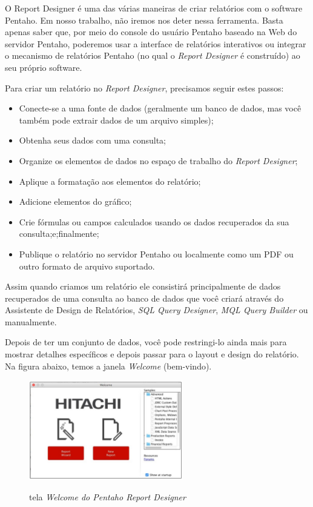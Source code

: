 O Report Designer \'{e} uma das v\'{a}rias maneiras de criar relat\'orios com o software Pentaho. Em nosso trabalho, n\~{a}o iremos nos deter nessa ferramenta. Basta apenas saber que, por meio do console do usu\'{a}rio Pentaho baseado na Web do servidor Pentaho, poderemos usar a interface de relat\'orios interativos ou integrar o mecanismo de relat\'orios Pentaho (no qual o \textit{Report Designer} \'{e} constru\'{i}do) ao seu pr\'oprio software.

Para criar um relat\'orio no \textit{Report Designer}, precisamos seguir estes passos:

\begin{itemize}
    \item Conecte-se a uma fonte de dados (geralmente um banco de dados, mas você tamb\'{e}m pode extrair dados de um arquivo simples);
    \item Obtenha seus dados com uma consulta;
    \item Organize os elementos de dados no espa\c{c}o de trabalho do \textit{Report Designer};
    \item Aplique a formata\c{c}\~{a}o aos elementos do relat\'orio;
    \item Adicione elementos do gr\'{a}fico;
    \item Crie f\'ormulas ou campos calculados usando os dados recuperados da sua consulta;e;finalmente;
    \item Publique o relat\'orio no servidor Pentaho ou localmente como um PDF ou outro formato de arquivo suportado. 
\end{itemize}

Assim quando criamos um relat\'orio ele consistir\'{a} principalmente de dados recuperados de uma consulta ao banco de dados que você criar\'{a} atrav\'{e}s do Assistente de Design de Relat\'orios, \textit{SQL Query Designer}, \textit{MQL Query Builder} ou manualmente. 

Depois de ter um conjunto de dados, você pode restringi-lo ainda mais para mostrar detalhes espec\'{i}ficos e depois passar para o layout e design do relat\'orio. Na figura abaixo, temos a janela \textit{Welcome} (bem-vindo).

\begin{figure}[H]
	\vspace*{0,2cm}
    \centering
    \caption{tela \textit{Welcome do Pentaho Report Designer}}
    \includegraphics[width=0.6\textwidth]{./04-figuras/figura-welcome-prd}
    \label{fig:ilustfigwelcomeprd}
\end{figure}
\vspace*{-0,9cm}
{\raggedright {}} \\
 
